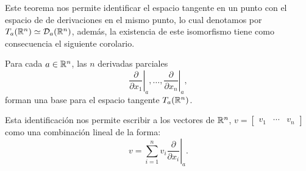 Este teorema nos permite identificar el espacio tangente en un punto con el espacio de de derivaciones en el mismo punto, lo cual denotamos por $T_a(\mathbb{R}^n) \simeq \mathcal{D}_a(\mathbb{R}^n)$, además, la existencia de este isomorfismo tiene como consecuencia el siguiente corolario.

\begin{corollary}\label{Corolario: Base de TpRn}
	Para cada $a \in \mathbb{R}^n$, las $n$ derivadas parciales
	\[
		\left. \frac{\partial }{\partial x_1} \right|_{a}, \dots, \left. \frac{\partial }{\partial x_n} \right|_{a},
	\]
	forman una base para el espacio tangente $T_a(\mathbb{R}^n)$.
\end{corollary}

Esta identificación nos permite escribir a los vectores de $\mathbb{R}^n$, $v = \begin{bmatrix} v_1 & \cdots & v_n \end{bmatrix}$ como una combinación lineal de la forma:
\[ 	v = \left. \sum_{i = 1}^{n} v_i \frac{\partial}{\partial x_i} \right|_{a}.\]

